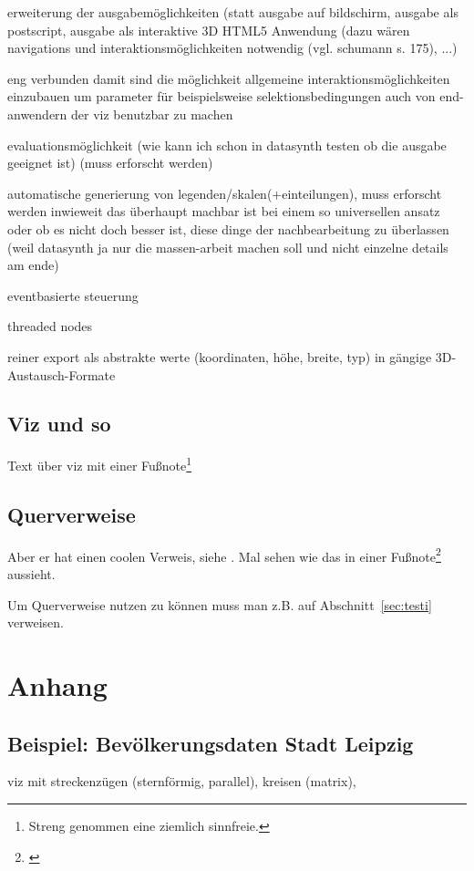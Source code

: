 \documentclass[a4paper, 12pt, onepage, pdftex, headsepline, footsepline]{scrreprt}
\begin{document}
erweiterung der ausgabemöglichkeiten (statt ausgabe auf bildschirm, ausgabe als postscript, ausgabe als interaktive 3D HTML5 Anwendung (dazu wären navigations und interaktionsmöglichkeiten notwendig (vgl. schumann s. 175), ...)

eng verbunden damit sind die möglichkeit allgemeine interaktionsmöglichkeiten einzubauen um parameter für beispielsweise selektionsbedingungen auch von end-anwendern der viz benutzbar zu machen

evaluationsmöglichkeit (wie kann ich schon in datasynth testen ob die ausgabe geeignet ist) (muss erforscht werden)

automatische generierung von legenden/skalen(+einteilungen), muss erforscht werden inwieweit das überhaupt machbar ist bei einem so universellen ansatz oder ob es nicht doch besser ist, diese dinge der nachbearbeitung zu überlassen (weil datasynth ja nur die massen-arbeit machen soll und nicht einzelne details am ende)

eventbasierte steuerung

threaded nodes

reiner export als abstrakte werte (koordinaten, höhe, breite, typ) in gängige 3D-Austausch-Formate

\section*{Viz und so}

Text über viz mit einer Fußnote\footnote{Streng genommen eine ziemlich sinnfreie.}

\section*{Querverweise}

Aber er hat einen coolen Verweis, siehe \cite[S.\,35--38]{Visualisierung}.
Mal sehen wie das in einer Fußnote\footnote{\cite{Visualisierung}} aussieht.

Um Querverweise nutzen zu können muss man z.B. auf Abschnitt~\ref{sec:testi} verweisen.



\listoftables
\listoffigures
\chapter{Anhang}
\section{Beispiel: Bevölkerungsdaten Stadt Leipzig}
viz mit streckenzügen (sternförmig, parallel), kreisen (matrix),
\end{document}
